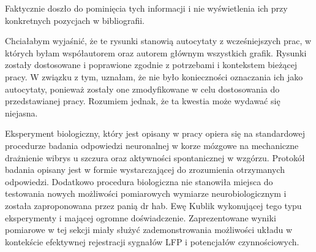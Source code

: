\begin{frame}[t]
    \begin{block}{\tb}
    \end{block}

Faktycznie doszło do pominięcia tych informacji i nie wyświetlenia ich przy konkretnych pozycjach w bibliografii.

    \begin{block}{\tb}
    \end{block}


    Chciałabym wyjaśnić, że te rysunki stanowią autocytaty z wcześniejszych prac, w których byłam współautorem oraz autorem głównym wszystkich grafik. Rysunki zostały dostosowane i poprawione zgodnie z potrzebami i kontekstem bieżącej pracy. W związku z tym, uznałam, że nie było konieczności oznaczania ich jako autocytaty, ponieważ zostały one zmodyfikowane w celu dostosowania do przedstawianej pracy. Rozumiem jednak, że ta kwestia może wydawać się niejasna.


\end{frame}


  
\begin{frame}[t]

    \begin{block}{\tb}
    \end{block}
    Eksperyment biologiczny, który jest opisany w pracy opiera się na standardowej procedurze badania odpowiedzi neuronalnej w korze mózgowe na mechaniczne drażnienie wibrys u szczura oraz aktywności spontanicznej w wzgórzu.
 Protokół badania opisany jest w formie  wystarczającej do zrozumienia otrzymanych odpowiedzi.
 Dodatkowo procedura biologiczna nie stanowiła miejsca do testowania nowych możliwości pomiarowych wymiarze neurobiologicznym i została zaproponowana przez panią dr hab. Ewę Kublik wykonującej tego typu eksperymenty i mającej ogromne doświadczenie.
 Zaprezentowane wyniki pomiarowe w tej sekcji miały służyć zademonstrowania możliwości układu w kontekście efektywnej rejestracji sygnałów LFP i potencjałów czynnościowych.
\end{frame}

